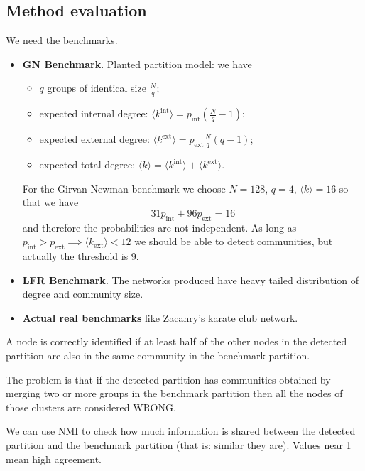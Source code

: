 \documentclass[a4paper,9pt]{extarticle}
\begin{document}
\begin{multicols*}{2}
		\subsection{Method evaluation}
		We need the benchmarks.
		\begin{itemize}
		\item \textbf{GN Benchmark}.
		Planted partition model: we have
		\begin{itemize}
			\item $q$ groups of identical size $\frac{N}{q}$;
			\item expected internal degree: $\langle k^{\mathrm{int}}\rangle=p_{\mathrm{int}}\left(\frac{N}{q}-1\right)$;
			\item expected external degree: $\langle k^{\mathrm{ext}}\rangle=p_{\mathrm{ext}}\frac{N}{q}(q-1)$;
			\item expected total degree: $\langle k\rangle=\langle k^{\mathrm{int}}\rangle+\langle k^{\mathrm{ext}}\rangle$.
		\end{itemize}
		For the Girvan-Newman benchmark we choose $N=128$, $q=4$, $\langle k\rangle=16$ so that we have 
		\begin{equation*}
			31p_{\mathrm{int}}+96p_{\mathrm{ext}}=16
		\end{equation*}
		and therefore the probabilities are not independent. As long as $p_{\mathrm{int}}>p_{\mathrm{ext}}\implies \langle k_{\mathrm{ext}}\rangle<12$ we should be able to detect communities, but actually the threshold is 9.
		\item \textbf{LFR Benchmark}. The networks produced have heavy tailed distribution of degree and community size.
		\item \textbf{Actual real benchmarks} like Zacahry's karate club network.
		\end{itemize}
		\begin{riquadro}
			A node is correctly identified if at least half of the other nodes in the detected partition are also in the same community in the benchmark partition.
		\end{riquadro}
		The problem is that if the detected partition has communities obtained by merging two or more groups in the benchmark partition then all the nodes of those clusters are considered WRONG.
		\begin{riquadro}
			We can use NMI to check how much information is shared between the detected partition and the benchmark partition (that is: similar they are). Values near 1 mean high agreement.

\end{riquadro}
\end{multicols*}
\end{document}
